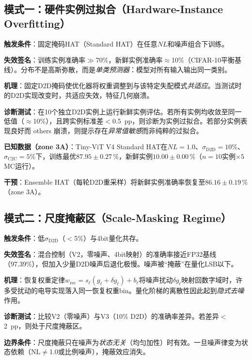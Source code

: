 \subsection{模式一：硬件实例过拟合（Hardware-Instance Overfitting）}
\label{subsec:failure_instance_overfitting}

\textbf{触发条件}：固定掩码HAT（Standard HAT）在任意$NL$和噪声组合下训练。

\textbf{失效签名}：训练实例准确率$\gg$70\%，新鲜实例准确率$\approx$10\%（CIFAR-10平衡基线）。分布不是高斯弥散，而是\emph{单类预测器}：模型对所有输入输出同一类别。

\textbf{机理}：固定D2D掩码使优化器将权重调整到与该特定失配模式\emph{共适应}。当测试时的D2D实现改变时，共适应失效，特征几何崩溃。

\textbf{诊断测试}：在10个独立D2D实例上运行新鲜实例评估。若所有实例均收敛至同一低值（$\approx$10\%），且跨实例标准差$<$0.5~pp，则诊断为实例过拟合。若部分实例表现良好而 others 崩溃，则提示存在\emph{异常值敏感}而非纯粹的过拟合。

\textbf{已知数据（zone 3A）}：Tiny-ViT V4 Standard HAT在$NL=1.0$、$\sigma_{\mathrm{D2D}}=10\%$、$\sigma_{\mathrm{C2C}}=5\%$下，训练最优$87.95\pm0.27\,\%$，新鲜实例$10.00\pm0.00\,\%$（$n=10$实例$\times5$ MC运行）。

\textbf{干预}：Ensemble HAT（每轮D2D重采样）将新鲜实例准确率恢复至$86.16\pm0.19\,\%$（zone 3A）。

\subsection{模式二：尺度掩蔽区（Scale-Masking Regime）}
\label{subsec:failure_scale_masking}

\textbf{触发条件}：低$\sigma_{\mathrm{D2D}}$（$<$5\%）与4bit量化共存。

\textbf{失效签名}：混合控制（V2，零噪声、4bit映射）的准确率接近FP32基线（97.39\%），但加入少量D2D噪声后退化极慢。噪声被“掩蔽”在量化LSB以下。

\textbf{机理}：恢复权重定律$w_{\mathrm{rec}} = s_{\ell}(g_{\ell} + \delta g_{\ell}) + b_{\ell}$将噪声扰动$\delta g_{\ell}$映射回数字域时，许多受扰动的电导实现落入同一恢复权重bin。量化阶梯的离散性因此起到\emph{隐式去噪}作用。

\textbf{诊断测试}：比较V2（零噪声）与V3（10\% D2D）的准确率差异。若差异$<$2~pp，则处于尺度掩蔽区。

\textbf{边界条件}：尺度掩蔽只在噪声为\emph{状态无关}（均匀加性）时有效。一旦噪声律变为状态依赖（NL$\neq$1.0或比例噪声），掩蔽效应消失。

